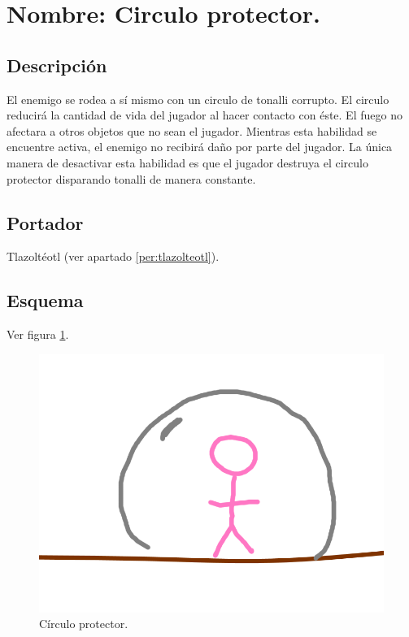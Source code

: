\section{Nombre: Circulo protector.} \label{hab.CirPro}
\subsection{Descripción}
El enemigo se rodea a sí mismo con un circulo de tonalli corrupto. El circulo reducirá la cantidad de vida del jugador al hacer contacto con éste. El fuego no afectara a otros objetos que no sean el jugador. Mientras esta habilidad se encuentre activa, el enemigo no recibirá daño por parte del jugador. La única manera de desactivar esta habilidad es que el jugador destruya el circulo protector disparando tonalli de manera constante. 
\subsection{Portador}
Tlazoltéotl (ver apartado \ref{per:tlazolteotl}).
\subsection{Esquema}
			Ver figura \ref{fig:circuloP}.
			\begin{figure}
				\centering
				\includegraphics[height=0.2 \textheight]{Imagenes/circuloP}
				\caption{Círculo protector.}
				\label{fig:circuloP}
			\end{figure}
